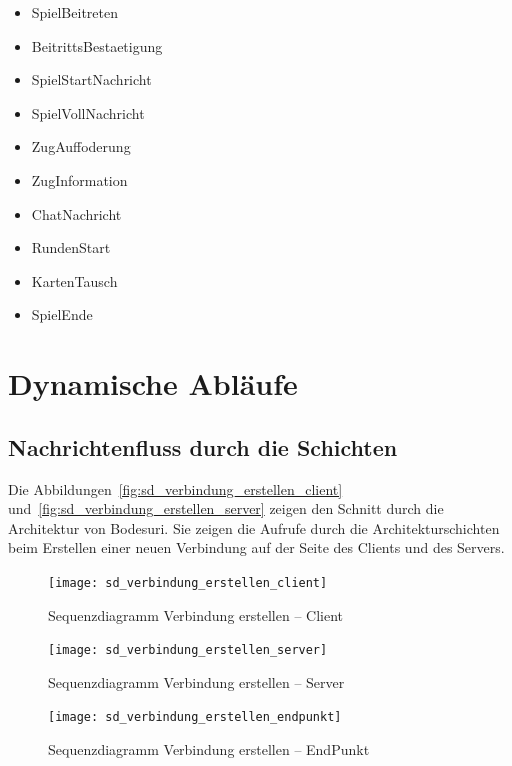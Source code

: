 \documentclass[12pt,halfparskip]{scrartcl}
\begin{document}
\begin{itemize}
	\item SpielBeitreten
	\item BeitrittsBestaetigung
	\item SpielStartNachricht
	\item SpielVollNachricht
	\item ZugAuffoderung
	\item ZugInformation
	\item ChatNachricht
	\item RundenStart
	\item KartenTausch
	\item SpielEnde
\end{itemize}

\clearpage
\section{Dynamische Abläufe}
\label{dynamische_ablauefe}
\subsection{Nachrichtenfluss durch die Schichten}
\label{sub:nachrichtenfluss_durch_die_schichten}
Die Abbildungen~\vref{fig:sd_verbindung_erstellen_client} und~\vref{fig:sd_verbindung_erstellen_server} zeigen den Schnitt durch die Architektur von Bodesuri. Sie zeigen die Aufrufe durch die Architekturschichten beim Erstellen einer neuen Verbindung auf der Seite des Clients und des Servers.
\begin{figure}[h]
	\centering
	\texttt{[image: sd\_verbindung\_erstellen\_client]}
	\caption{Sequenzdiagramm Verbindung erstellen -- Client}
	\label{fig:sd_verbindung_erstellen_client}
\end{figure}
\begin{figure}[h]
	\centering
	\texttt{[image: sd\_verbindung\_erstellen\_server]}
	\caption{Sequenzdiagramm Verbindung erstellen -- Server}
	\label{fig:sd_verbindung_erstellen_server}
\end{figure}

\begin{figure}[h]
	\centering
	\texttt{[image: sd\_verbindung\_erstellen\_endpunkt]}
	\caption{Sequenzdiagramm Verbindung erstellen -- EndPunkt}
	\label{fig:sd_verbindung_erstellen_endpunkt}
\end{figure}
\end{document}
